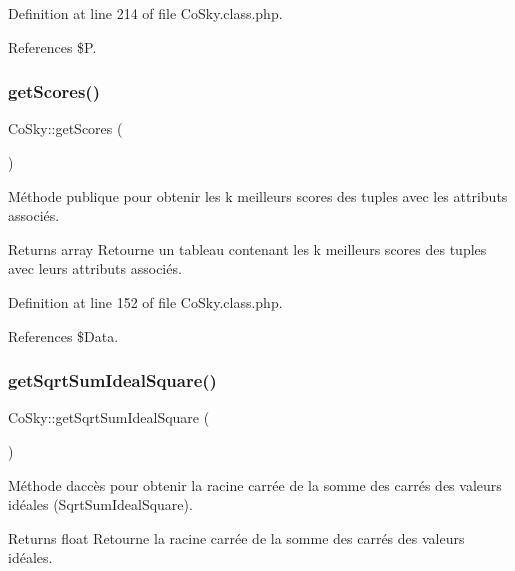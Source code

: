 Definition at line 214 of file Co\+Sky.\+class.\+php.



References \$P.

\mbox{\label{class_co_sky_a873b1aa1f399f9545bbcaed5eab37841}} 
\subsubsection{\texorpdfstring{get\+Scores()}{getScores()}}
{\footnotesize\ttfamily Co\+Sky\+::get\+Scores (\begin{DoxyParamCaption}{ }\end{DoxyParamCaption})}

Méthode publique pour obtenir les k meilleurs scores des tuples avec les attributs associés.

\begin{DoxyReturn}{Returns}
array Retourne un tableau contenant les k meilleurs scores des tuples avec leurs attributs associés. 
\end{DoxyReturn}


Definition at line 152 of file Co\+Sky.\+class.\+php.



References \$\+Data.

\mbox{\label{class_co_sky_a2672b5893cf0a533234d3aedcbf63623}} 
\subsubsection{\texorpdfstring{get\+Sqrt\+Sum\+Ideal\+Square()}{getSqrtSumIdealSquare()}}
{\footnotesize\ttfamily Co\+Sky\+::get\+Sqrt\+Sum\+Ideal\+Square (\begin{DoxyParamCaption}{ }\end{DoxyParamCaption})}

Méthode d\textquotesingle{}accès pour obtenir la racine carrée de la somme des carrés des valeurs idéales (Sqrt\+Sum\+Ideal\+Square).

\begin{DoxyReturn}{Returns}
float Retourne la racine carrée de la somme des carrés des valeurs idéales. 
\end{DoxyReturn}


